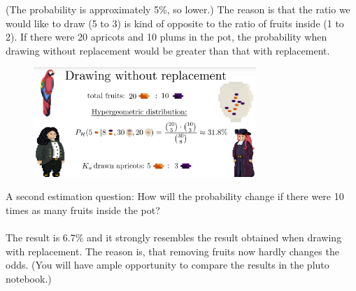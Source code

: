 \documentclass[12pt, a4paper]{scrartcl}
\begin{document}
(The probability is approximately 5\%, so lower.)
The reason is that the ratio we would like to draw (5 to 3) is kind of opposite to the ratio of fruits inside (1 to 2). If there were 20 apricots and 10 plums in the pot, the probability when drawing without replacement would be greater than that with replacement.
 \begin{figure}[H]
	\centering
	\includegraphics[width=0.75\textwidth]{4_7.png}
\end{figure}
A second estimation question: How will the probability change if there were 10 times as many fruits inside the pot?\\

\\

The result is 6.7\% and it strongly resembles the result obtained when drawing with replacement. The reason is, that removing fruits now hardly changes the odds. 
(You will have ample opportunity to compare the results in the pluto notebook.)\\
\end{document}
